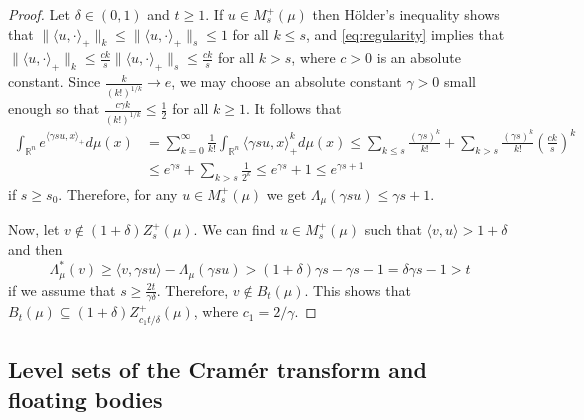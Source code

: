 \documentclass[11pt,leqno]{article}
\theoremstyle{definition}
\theoremstyle{remark}
\numberwithin{equation}{section}
\newcommand{\ls}{\leqslant}
\newcommand{\gr}{\geqslant}
\newcommand{\1}{\textbf{1}}
\begin{document}
\begin{proof}Let $\delta\in (0,1)$ and $t\gr 1$. If $u\in M^+_s(\mu)$ then H\"{o}lder's inequality shows that
$\|\langle u,\cdot\rangle_+\|_k\ls \|\langle u,\cdot\rangle_+\|_s\ls 1$ for all $k\ls s$, and \eqref{eq:regularity}
implies that $\|\langle u,\cdot\rangle_+\|_k\ls \frac{ck}{s}\|\langle u,\cdot\rangle_+\|_s\ls \frac{ck}{s}$
for all $k>s$, where $c>0$ is an absolute constant. Since $\frac{k}{(k!)^{1/k}}\to e$, we may choose an absolute constant $\gamma>0$ small enough so that $\frac{c\gamma k}{(k!)^{1/k}}\ls\frac{1}{2}$ for all $k\gr 1$.  It follows that
\begin{align*}
\int_{{\mathbb R}^n} e^{\langle \gamma su,x\rangle_+}d\mu(x)
&=\sum_{k=0}^{\infty}\frac{1}{k!}\int_{{\mathbb R}^n}\langle \gamma su, x\rangle_+^kd\mu(x)
\ls \sum_{k\ls s}\frac{(\gamma s)^k}{k!}+\sum_{k>s}\frac{(\gamma s)^k}{k!}\left (\frac{ck}{s}\right )^k\\
&\ls e^{\gamma s}+\sum_{k>s}\frac{1}{2^k}\ls e^{\gamma s}+1\ls e^{\gamma s+1}\end{align*}
if $s\gr s_0$. Therefore, for any $u\in M^+_s(\mu)$ we get $\Lambda_{\mu}(\gamma su)\ls\gamma s+1$.

Now, let $v\notin (1+\delta)Z^+_s(\mu)$. We can find $u\in M^+_s(\mu)$ such that $\langle v,u\rangle> 1+\delta $ and then
\begin{equation*}\Lambda^{\ast }_{\mu }(v) \gr \langle v,\gamma su\rangle
-\Lambda_{\mu }(\gamma su)> (1+\delta)\gamma s -\gamma s-1=\delta\gamma s-1>t\end{equation*}
if we assume that $s\gr \frac{2t}{\gamma\delta}$. Therefore, $v\notin
B_t(\mu )$. This shows that $B_t(\mu)\subseteq (1+\delta)Z^+_{c_1t/\delta} (\mu)$, where $c_1=2/\gamma$. \end{proof}






\subsection{Level sets of the Cram\'{e}r transform and floating bodies}\label{subsection-2.3}
\end{document}
